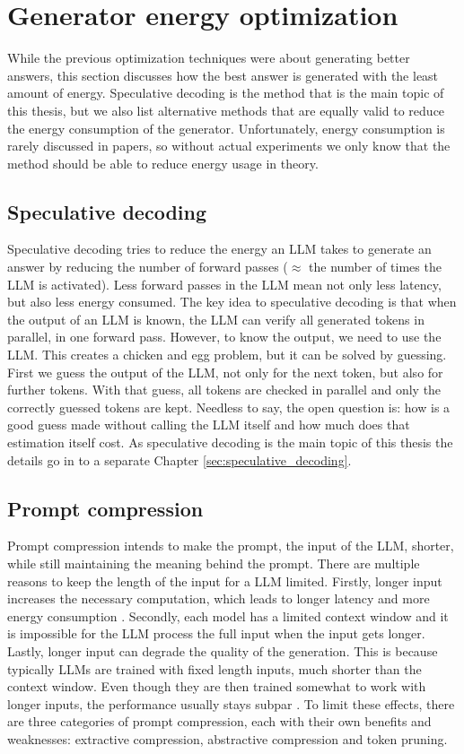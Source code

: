 \section{Generator energy optimization}
While the previous optimization techniques were about generating better answers, this section discusses how the best answer is generated with the least amount of energy. Speculative decoding is the method that is the main topic of this thesis, but we also list alternative methods that are equally valid to reduce the energy consumption of the generator. Unfortunately, energy consumption is rarely discussed in papers, so without actual experiments we only know that the method should be able to reduce energy usage in theory.

\subsection{Speculative decoding}
Speculative decoding tries to reduce the energy an LLM takes to generate an answer by reducing the number of forward passes ($\approx$ the number of times the LLM is activated). Less forward passes in the LLM mean not only less latency, but also less energy consumed. The key idea to speculative decoding is that when the output of an LLM is known, the LLM can verify all generated tokens in parallel, in one forward pass. However, to know the output, we need to use the LLM. This creates a chicken and egg problem, but it can be solved by guessing. First we guess the output of the LLM, not only for the next token, but also for further tokens. With that guess, all tokens are checked in parallel and only the correctly guessed tokens are kept. Needless to say, the open question is: how is a good guess made without calling the LLM itself and how much does that estimation itself cost. As speculative decoding is the main topic of this thesis the details go in to a separate Chapter \ref{sec:speculative_decoding}.

\subsection{Prompt compression}
Prompt compression intends to make the prompt, the input of the LLM, shorter, while still maintaining the meaning behind the prompt. There are multiple reasons to keep the length of the input for a LLM limited. Firstly, longer input increases the necessary computation, which leads to longer latency and more energy consumption \cite{kim2023arithmeticintensityllm}. Secondly, each model has a limited context window and it is impossible for the LLM process the full input when the input gets longer. Lastly, longer input can degrade the quality of the generation. This is because typically LLMs are trained with fixed length inputs, much shorter than the context window. Even though they are then trained somewhat to work with longer inputs, the performance usually stays subpar \cite{levy2024sameinputlength, liu2024lost}. To limit these effects, there are three categories of prompt compression, each with their own benefits and weaknesses: extractive compression, abstractive compression and token pruning.

